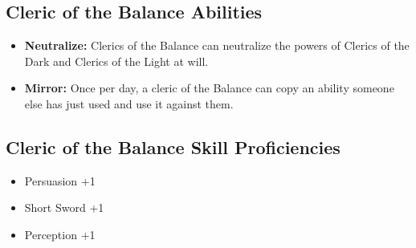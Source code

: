 \begin{multicols}{2}
\subsection{Cleric of the Balance Abilities}

\begin{itemize}
    \item \textbf{Neutralize:} Clerics of the Balance can neutralize the powers of
    Clerics of the Dark and Clerics of the Light at will.
    \item \textbf{Mirror:} Once per day, a cleric of the Balance can copy an ability
    someone else has just used and use it against them.
\end{itemize}

\subsection{Cleric of the Balance Skill Proficiencies}

\begin{itemize}
    \item Persuasion +1
    \item Short Sword +1
    \item Perception +1
\end{itemize}

\end{multicols}
